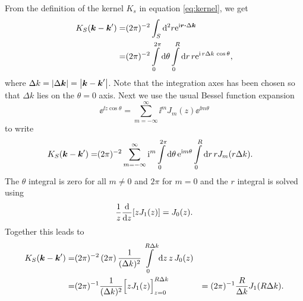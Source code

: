 \documentclass[11pt,a4paper, 
swedish,english %
]{article}
\begin{document}
From the definition of the kernel $K_s$ in equation \eqref{eq:kernel}, we get 
\begin{equation}
\begin{aligned}
K_S(\vb*k-\vb*k') =& (2\pi)^{-2}
\oldint_S \rd^2r \ee^{\ii\vb*r\vdot\Delta\vb*k}\\
=& (2\pi)^{-2}
\int_0^{2\pi}\rd\theta \int_0^{R} \rd{r}\,r
 \ee^{\ii\, r\Delta{k}\,\cos\theta},
\end{aligned}
\end{equation}
where $\Delta{k} = \abs{\Delta\vb*k} = \abs{\vb*k-\vb*k'}$.
Note that the integration axes has been chosen so that $\Delta{k}$
lies on the $\theta=0$ axis.
Next we use the usual Bessel function expansion \cite[formula 8.551.4b]{Gradshteyn-Ryzhik}
\begin{equation}
\ee^{\ii z\cos\theta} = \sum_{m=-\infty}^\infty
\ii^mJ_m(z)\ee^{\ii m\theta}
\end{equation}
to write 
\begin{equation}
\begin{aligned}
K_S(\vb*k-\vb*k') =& (2\pi)^{-2}
\sum_{m=-\infty}^\infty \ii^m
\int_0^{2\pi}\rd\theta\, \ee^{\ii m\theta}
\int_0^{R} \rd{r}\,r J_m(r\Delta{k}).
\end{aligned}
\end{equation}
The $\theta$ integral is zero for all $m\neq0$ and $2\pi$ for $m=0$ and the $r$ integral is solved using 
\cite[formula~8.472.3]{Gradshteyn-Ryzhik} 
\begin{equation}
\frac{1}{z}\dv{z}\qty[zJ_1(z)] = J_0(z).
\end{equation}
Together this leads to
\begin{equation}
\begin{aligned}
K_S(\vb*k-\vb*k') =& (2\pi)^{-2}
\,(2\pi)\,\frac{1}{(\Delta{k})^2}
\int_0^{R\Delta{k}} \rd{z}\,z\, J_0(z)\\
=& (2\pi)^{-1} \frac{1}{(\Delta{k})^2}
\Big[zJ_1(z)\Big]_{z=0}^{R\Delta k}
&=(2\pi)^{-1} \frac{R}{\Delta{k}} J_1(R\Delta{k}).
\end{aligned}
\end{equation}
\end{document}
